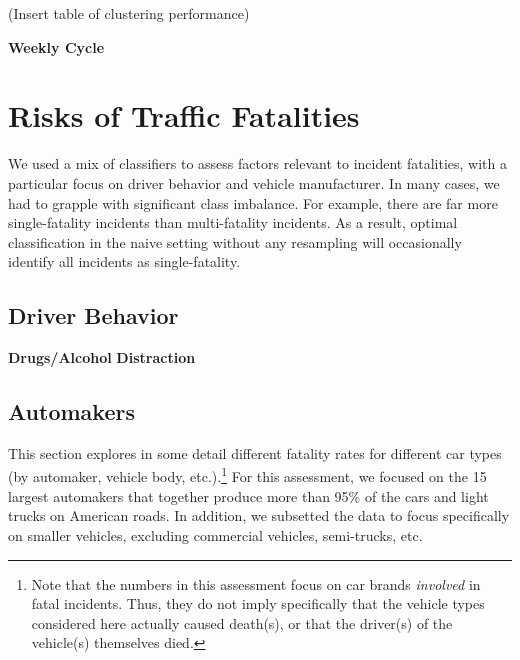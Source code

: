 \documentclass[11pt, oneside]{article}   	%
\begin{document}
(Insert table of clustering performance)

\textbf{Weekly Cycle} \\

\section*{Risks of Traffic Fatalities}
We used a mix of classifiers to assess factors relevant to incident fatalities, with a particular focus on driver behavior and vehicle manufacturer. In many cases, we had to grapple with significant class imbalance. For example, there are far more single-fatality incidents than multi-fatality incidents. As a result, optimal classification in the naive setting without any resampling will occasionally identify all incidents as single-fatality.   

\subsection*{Driver Behavior}
\textbf{Drugs/Alcohol}
\textbf{Distraction}

\subsection*{Automakers}

This section explores in some detail different fatality rates for different car types (by automaker, vehicle body, etc.).\footnote{Note that the numbers in this assessment focus on car brands \textit{involved} in fatal incidents. Thus, they do not imply specifically that the vehicle types considered here actually caused death(s), or that the driver(s) of the vehicle(s) themselves died.} For this assessment, we focused on the 15 largest automakers that together produce more than 95\% of the cars and light trucks on American roads. In addition, we subsetted the data to focus specifically on smaller vehicles, excluding commercial vehicles, semi-trucks, etc. \\
\end{document}
